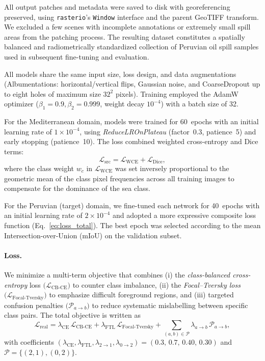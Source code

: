 \documentclass[12pt]{article}
\begin{document}
All output patches and metadata were saved to disk with georeferencing preserved,
using \texttt{rasterio}’s \texttt{Window} interface and the parent GeoTIFF transform.
We excluded a few scenes with incomplete annotations or extremely small spill areas
from the patching process.
The resulting dataset constitutes a spatially balanced and radiometrically standardized
collection of Peruvian oil spill samples used in subsequent fine-tuning and evaluation.




All models share the same input size, loss design, and data augmentations (Albumentations: horizontal/vertical flips, Gaussian noise, and 
CoarseDropout up to eight holes of maximum size $32^2$ pixels). Training employed the AdamW optimizer 
($\beta_1{=}0.9,\beta_2{=}0.999$, weight decay $10^{-4}$) with a batch size of 32.

For the Mediterranean domain, models were trained for 60~epochs with an initial learning rate 
of $1\times10^{-4}$, using \textit{ReduceLROnPlateau} (factor~0.3, patience~5) and early stopping (patience~10). 
The loss combined weighted cross-entropy and Dice terms:
\[
\mathcal{L}_{\text{src}} = \mathcal{L}_{\mathrm{WCE}} + \mathcal{L}_{\mathrm{Dice}},
\]
where the class weight $w_c$ in $\mathcal{L}_{\mathrm{WCE}}$ was set inversely proportional to the geometric mean 
of the class pixel frequencies across all training images to compensate for the dominance of the sea class.  

For the Peruvian (target) domain, we fine-tuned each network for 40~epochs with an initial learning rate 
of $2\times10^{-4}$ and adopted a more expressive composite loss function (Eq.~\ref{eq:loss_total}). 
The best epoch was selected according to the mean Intersection-over-Union (mIoU) on the validation subset.

\paragraph{Loss.}
We minimize a multi-term objective that combines 
(i) the \emph{class-balanced cross-entropy} loss
$\big(\mathcal{L}_{\mathrm{CB\mbox{-}CE}}\big)$
to counter class imbalance,
(ii) the \emph{Focal--Tversky loss}
$\big(\mathcal{L}_{\mathrm{Focal\mbox{-}Tversky}}\big)$
to emphasize difficult foreground regions,
and (iii) targeted confusion penalties
$\big(\mathcal{P}_{a\!\to\!b}\big)$
to reduce systematic mislabelling between specific class pairs.
The total objective is written as
\begin{equation}
\label{eq:loss_total}
\mathcal{L}_{\text{real}}
 = \lambda_{\mathrm{CE}}\,
   \mathcal{L}_{\mathrm{CB\mbox{-}CE}}
 + \lambda_{\mathrm{FTL}}\,
   \mathcal{L}_{\mathrm{Focal\mbox{-}Tversky}}
 + \sum_{(a,b)\in\mathcal{P}}
   \lambda_{a\!\to\!b}\,
   \mathcal{P}_{a\!\to\!b},
\end{equation}
with coefficients
$(\lambda_{\mathrm{CE}},\lambda_{\mathrm{FTL}},\lambda_{2\to1},\lambda_{0\to2})
 =(0.3,\,0.7,\,0.40,\,0.30)$
and $\mathcal{P}=\{(2,1),(0,2)\}$.
\end{document}

